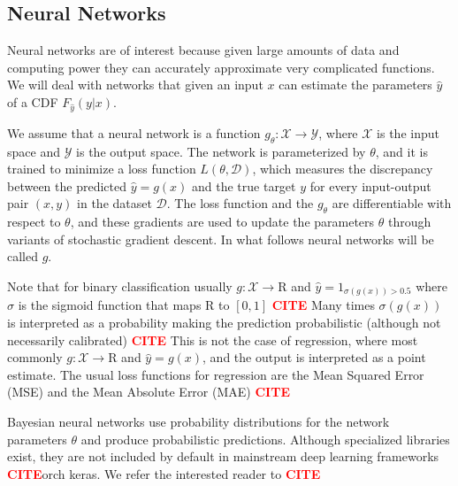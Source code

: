 \documentclass{article}
\newcommand{\citee}[1]{\textbf{\textcolor{red}{CITE}}}
\begin{document}
\subsection{Neural Networks}
Neural networks are of interest because given large amounts of data and computing power they can accurately approximate very complicated functions. We will deal with networks that given an input $x$ can estimate the parameters $\hat y$ of a CDF $F_{\hat y}(y|x)$.

We assume that a neural network is a function $g_\theta : \mathcal{X} \to \mathcal{Y}$, where $\mathcal{X}$ is the input space and $\mathcal{Y}$ is the output space. The network is parameterized by $\theta$, and it is trained to minimize a loss function $L(\theta, \mathcal{D})$, which measures the discrepancy between the predicted $\hat{y}=g(x)$ and the true target $y$ for every input-output pair $(x, y)$ in the dataset $\mathcal D$. The loss function and the $g_\theta$ are differentiable with respect to $\theta$, and these gradients are used to update the parameters $\theta$ through variants of stochastic gradient descent. In what follows neural networks will be called $g$. 

Note that for binary classification usually $g: \mathcal{X} \to \mathrm{R}$ and $\hat y = \mathrm{1}_{\sigma(g(x))>0.5}$ where $\sigma$ is the sigmoid function that maps $\mathrm{R}$ to $[0,1]$ \citee. Many times $\sigma(g(x))$ is interpreted as a probability making the prediction probabilistic (although not necessarily calibrated) \citee. This is not the case of regression, where most commonly $g: \mathcal{X} \to \mathrm{R}$ and $\hat y = g(x)$, and the output is interpreted as a point estimate. The usual loss functions for regression are the Mean Squared Error (MSE) and the Mean Absolute Error (MAE) \citee.

Bayesian neural networks use probability distributions for the network parameters $\theta$ and produce probabilistic predictions. Although specialized libraries exist, they are not included by default in mainstream deep learning frameworks \citee torch keras. We refer the interested reader to \citee.
\end{document}
